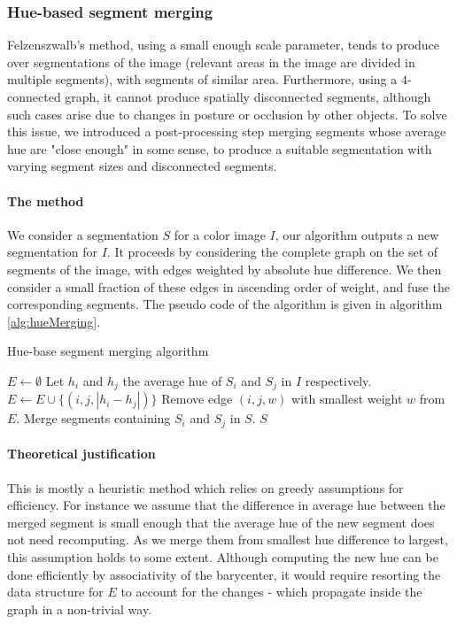 \subsubsection{Hue-based segment merging}
\label{sec:hueMerging}

Felzenszwalb's method, using a small enough scale parameter, tends to produce over segmentations of the image (relevant areas in the image are divided in multiple segments), with segments of similar area. Furthermore, using a $4$-connected graph, it cannot produce spatially disconnected segments, although such cases arise due to changes in posture or occlusion by other objects. To solve this issue, we introduced a post-processing step merging segments whose average hue are "close enough" in some sense, to produce a suitable segmentation with varying segment sizes and disconnected segments.

\paragraph{The method} We consider a segmentation $S$ for a color image $I$, our algorithm outputs a new segmentation for $I$. It proceeds by considering the complete graph on the set of segments of the image, with edges weighted by absolute hue difference. We then consider a small fraction of these edges in ascending order of weight, and fuse the corresponding segments. The pseudo code of the algorithm is given in algorithm \autoref{alg:hueMerging}.

\begin{algorithm}
\caption{Hue-base segment merging algorithm}
\label{alg:hueMerging}

\begin{algorithmic}[1]
\State $E \gets \emptyset$
\State Let $h_i$ and $h_j$ the average hue of $S_i$ and $S_j$ in $I$ respectively.
\State $E \gets E \cup \{(i, j, |h_i - h_j| )\}$
\EndFor
{}
\State Remove edge $(i,j,w)$ with smallest weight $w$ from $E$.
\State Merge segments containing $S_i$ and $S_j$ in $S$.
\EndFor
\Return $S$
\EndFunction
\end{algorithmic}
\end{algorithm}

\paragraph{Theoretical justification} This is mostly a heuristic method which relies on greedy assumptions for efficiency. For instance we assume that the difference in average hue between the merged segment is small enough that the average hue of the new segment does not need recomputing. As we merge them from smallest hue difference to largest, this assumption holds to some extent. Although computing the new hue can be done efficiently by associativity of the barycenter, it would require resorting the data structure for $E$ to account for the changes - which propagate inside the graph in a non-trivial way.

